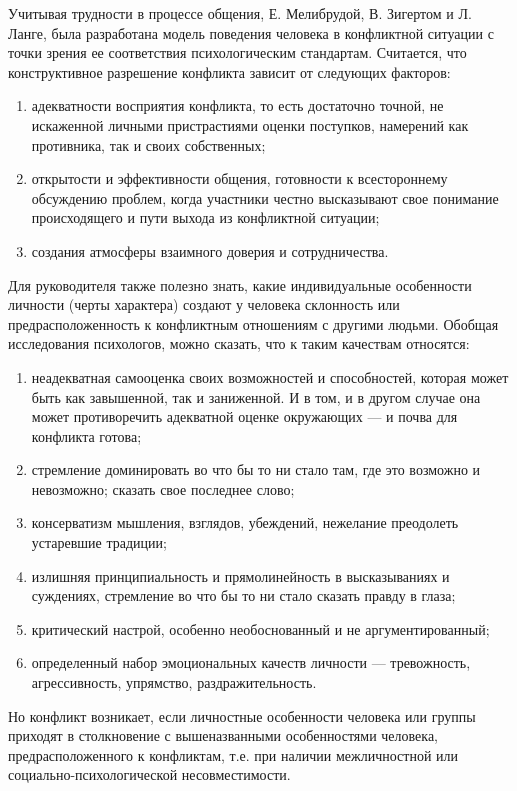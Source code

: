 \documentclass[a4paper,14pt]{extarticle}
\begin{document}
Учитывая трудности в процессе общения, Е.  Мелибрудой, В. Зигертом и Л. Ланге, была разработана модель поведения человека в конфликтной ситуации с точки зрения ее соответствия психологическим стандартам. Считается, что конструктивное разрешение конфликта зависит от следующих факторов:

\begin{enumerate}
    \item адекватности восприятия конфликта, то есть достаточно точной, не искаженной личными пристрастиями оценки поступков, намерений как противника, так и своих собственных;
    \item открытости и эффективности общения, готовности к всестороннему обсуждению проблем, когда участники честно высказывают свое понимание происходящего и пути выхода из конфликтной ситуации;
    \item создания атмосферы взаимного доверия и сотрудничества.
\end{enumerate}

Для руководителя также полезно знать, какие индивидуальные особенности личности (черты характера) создают у человека склонность или предрасположенность к конфликтным отношениям с другими людьми. Обобщая исследования психологов, можно сказать, что к таким качествам относятся:

\begin{enumerate}
    \item неадекватная самооценка своих возможностей и способностей, которая может быть как завышенной, так и заниженной. И в том, и в другом случае она может противоречить адекватной оценке окружающих — и почва для конфликта готова;
    \item стремление доминировать во что бы то ни стало там, где это возможно и невозможно; сказать свое последнее слово;
    \item консерватизм мышления, взглядов, убеждений, нежелание преодолеть устаревшие традиции;
    \item излишняя принципиальность и прямолинейность в высказываниях и суждениях, стремление во что бы то ни стало сказать правду в глаза;
    \item критический настрой, особенно необоснованный и не аргументированный;
    \item определенный набор эмоциональных качеств личности — тревожность, агрессивность, упрямство, раздражительность.
\end{enumerate}

Но конфликт возникает, если личностные особенности человека или группы приходят в столкновение с вышеназванными особенностями человека, предрасположенного к конфликтам, т.е. при наличии межличностной или социально-психологической несовместимости.
\end{document}
